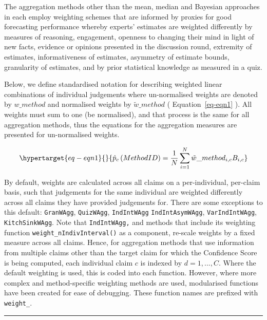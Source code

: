 \documentclass[article]{jss}
\begin{document}
The aggregation methods other than the mean, median and Bayesian
approaches in  each employ weighting schemes that are
informed by proxies for good forecasting performance whereby experts'
estimates are weighted differently by measures of reasoning, engagement,
openness to changing their mind in light of new facts, evidence or
opinions presented in the discussion round, extremity of estimates,
informativeness of estimates, asymmetry of estimate bounds, granularity
of estimates, and by prior statistical knowledge as measured in a quiz.

Below, we define standardised notation for describing weighted linear
combinations of individual judgements where un-normalised weights are
denoted by \(w\_method\) and normalised weights by
\(\tilde{w} \_ method\) ( Equation~\ref{eq-eqn1} ). All weights must sum
to one (be normalised), and that process is the same for all aggregation
methods, thus the equations for the aggregation measures are presented
for un-normalised weights.

\begin{equation}\protect\hypertarget{eq-eqn1}{}{
\hat{p}_c\left(Method \space ID \right) = \frac{1}{N}\sum_{i=1}^N \tilde{w}\_{method}_{i,c}  B_{i,c}
}\label{eq-eqn1}\end{equation}

By default, weights are calculated across all claims on a
per-individual, per-claim basis, such that judgements for the same
individual are weighted differently across all claims they have provided
judgements for. There are some exceptions to this default:
\texttt{GranWAgg}, \texttt{QuizWAgg}, \texttt{IndIntWAgg}
\texttt{IndIntAsymWAgg}, \texttt{VarIndIntWAgg}, \texttt{KitchSinkWAgg}.
Note that \texttt{IndIntWAgg,} and methods that include its weighting
function \texttt{weight\_nIndivInterval()} as a component, re-scale
weights by a fixed measure across all claims. Hence, for aggregation
methods that use information from multiple claims other than the target
claim for which the Confidence Score is being computed, each individual
claim \(c\) is indexed by \(d = 1, ..., C\). Where the default weighting
is used, this is coded into each function. However, where more complex
and method-specific weighting methods are used, modularised functions
have been created for ease of debugging. These function names are
prefixed with \texttt{weight\_}.

\begin{center}\rule{0.5\linewidth}{0.5pt}\end{center}
\end{document}
